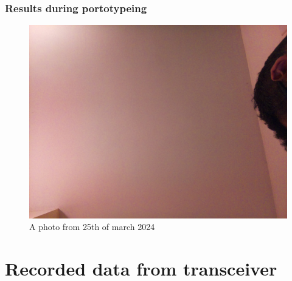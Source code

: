 \subsubsection{Results during portotypeing}
\begin{figure}[h!]
    \centering
    \includegraphics[width=0.4\linewidth]{Images/camera_output_2024-03-21_21-43-16.png}
    \caption{A photo from 25th of march 2024 }
    \label{A photo from 25th of march 2024}
\end{figure}
\section{Recorded data from transceiver}
